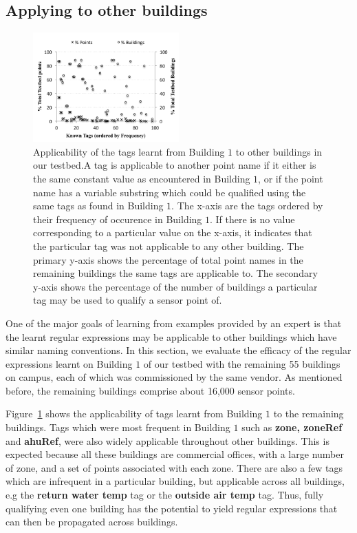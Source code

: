 \subsection{Applying to other buildings}


\begin{figure}[h!]
  
  \centering
    \includegraphics[width=0.5\textwidth]{figs/campusWideStats.pdf}
\caption{Applicability of the tags learnt from Building $1$ to other buildings in our testbed.A tag is applicable to another point name if it either is the same constant value as encountered in Building $1$, or if the point name has a variable substring which could be qualified using the same tags as found in Building $1$.  The x-axis are the tags ordered by their frequency of occurence in Building $1$. If there is no value corresponding to a particular value on the x-axis, it indicates that the particular tag was not applicable to any other building. The primary y-axis shows the percentage of total point names in the remaining buildings the same tags are applicable to. The secondary y-axis shows the percentage of the number of buildings a particular tag may be used to qualify a sensor point of.  }
\label{fig:campusWideStats}
\end{figure}




One of the major goals of learning from examples provided by an expert is that the learnt regular expressions may be applicable to other buildings which have similar naming conventions. In this section, we evaluate the efficacy of the regular expressions learnt on Building $1$ of our testbed with the remaining 55 buildings on campus, each of which was commissioned by the same vendor. As mentioned before, the remaining buildings comprise about 16,000 sensor points.

Figure~\ref{fig:campusWideStats} shows the applicability of tags learnt from Building $1$ to the remaining buildings. Tags which were most frequent in Building $1$ such as {\bf zone, zoneRef} and {\bf ahuRef}, were also widely applicable throughout other buildings. This is expected because all these buildings are commercial offices, with a large number of zone, and a set of points associated with each zone. There are also a few tags which are infrequent in a particular building, but applicable across all buildings, e.g the {\bf return water temp} tag or the {\bf outside air temp} tag. Thus, fully qualifying even one building has the potential to yield regular expressions that can then be propagated across buildings.

